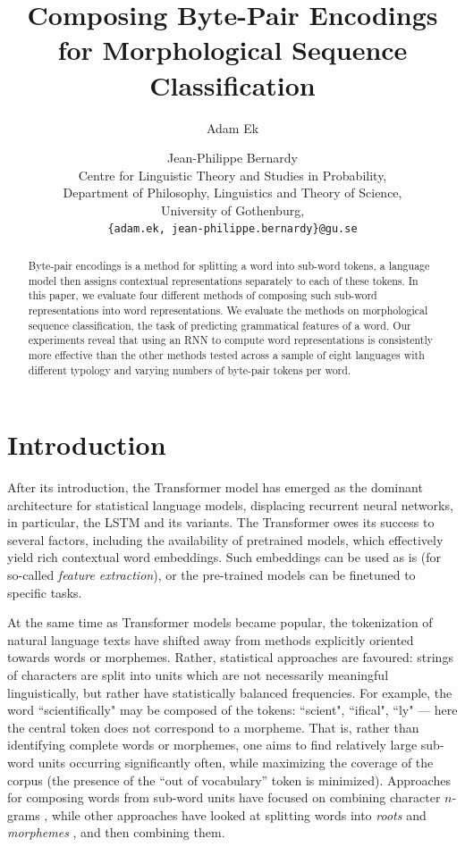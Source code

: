 \documentclass[11pt]{article}
\title{Composing Byte-Pair Encodings for Morphological Sequence Classification}
\author{Adam Ek \and Jean-Philippe Bernardy\\
	Centre for Linguistic Theory and Studies in Probability,\\
	Department of Philosophy, Linguistics and Theory of Science,\\
	University of Gothenburg,\\
	\texttt{\{adam.ek, jean-philippe.bernardy\}@gu.se}}
\date{}
\newcommand\citep{\cite}
\begin{document}
\maketitle
\begin{abstract}
          Byte-pair encodings is a method for splitting a word into
     sub-word tokens, a language model then assigns contextual
     representations separately to each of these tokens.  In this
     paper, we evaluate four different methods of composing such
     sub-word representations into word representations. We evaluate
     the methods on morphological sequence classification,
     the task of predicting grammatical features of a word. Our
     experiments reveal that using an RNN to compute word
     representations is consistently more effective than the other
     methods tested across a sample of eight languages with different
     typology and varying numbers of byte-pair tokens per word.
\end{abstract}

	\section{Introduction}
	\label{intro}

            After its introduction, the Transformer model
     \citep{vaswani2017attention} has emerged as the dominant
     architecture for statistical language models, displacing
     recurrent neural networks, in particular, the LSTM and its
     variants. The Transformer owes its success to several factors,
     including the availability of pretrained models, which
     effectively yield rich contextual word embeddings. Such
     embeddings can be used as is (for so-called \emph{feature extraction}),
     or the pre-trained models can be finetuned to specific
     tasks.

    	At the same time as Transformer models became popular, the
     tokenization of natural language texts have shifted away from
     methods explicitly oriented towards words or morphemes. Rather,
     statistical approaches are favoured: strings of
     characters are split into units which are not necessarily meaningful
     linguistically, but rather have statistically balanced
     frequencies. For example, the word ``scientifically" may be
     composed of the tokens: ``scient", ``ifical", ``ly" --- here the
     central token does not correspond to a morpheme.
             That is, rather than identifying complete words or
     morphemes, one aims to find relatively large sub-word units
     occurring significantly often, while maximizing the coverage of
     the corpus (the presence of the ``out of vocabulary'' token is
     minimized). Approaches for composing words from sub-word units
     have focused on combining character $n$-grams
     \citep{bojanowski2017enriching}, while other approaches have
     looked at splitting words into \textit{roots} and
     \textit{morphemes}
     \citep{el2012orthographic,chaudhary2018adapting,xu2017implicitly},
     and then combining them.
\end{document}
